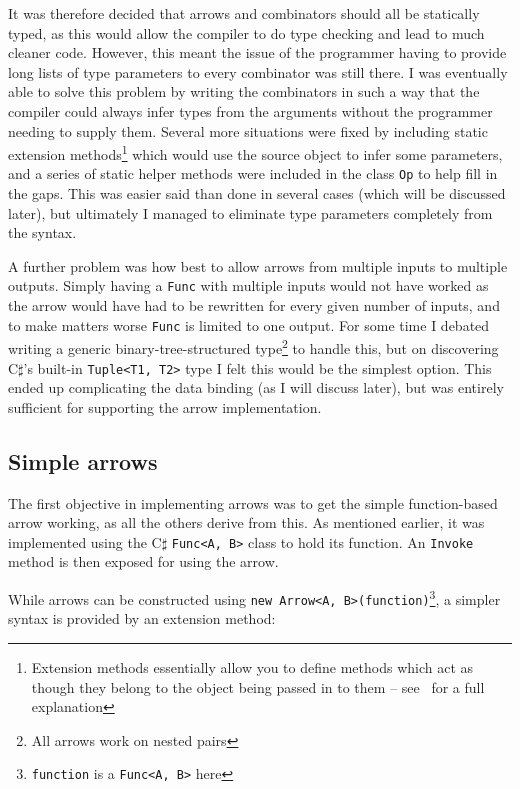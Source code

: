 \documentclass[12pt,twoside,notitlepage]{report}
\begin{document}
It was therefore decided that arrows and combinators should all be statically typed, as this would allow the compiler to do type checking and lead to much cleaner code. However, this meant the issue of the programmer having to provide long lists of type parameters to every combinator was still there. I was eventually able to solve this problem by writing the combinators in such a way that the compiler could always infer types from the arguments without the programmer needing to supply them. Several more situations were fixed by including static extension methods\footnote{Extension methods essentially allow you to define methods which act as though they belong to the object being passed in to them -- see~\cite{extension_methods} for a full explanation} which would use the source object to infer some parameters, and a series of static helper methods were included in the class \texttt{Op} to help fill in the gaps. This was easier said than done in several cases (which will be discussed later), but ultimately I managed to eliminate type parameters completely from the syntax.

A further problem was how best to allow arrows from multiple inputs to multiple outputs. Simply having a \texttt{Func} with multiple inputs would not have worked as the arrow would have had to be rewritten for every given number of inputs, and to make matters worse \texttt{Func} is limited to one output. For some time I debated writing a generic binary-tree-structured type\footnote{All arrows work on nested pairs} to handle this, but on discovering C$\sharp$'s built-in \texttt{Tuple<T1, T2>} type I felt this would be the simplest option. This ended up complicating the data binding (as I will discuss later), but was entirely sufficient for supporting the arrow implementation.


\subsection{Simple arrows} \label{sec:simple_arrow_implementation}

The first objective in implementing arrows was to get the simple function-based arrow working, as all the others derive from this. As mentioned earlier, it was implemented using the C$\sharp$ \texttt{Func<A, B>} class to hold its function. An \texttt{Invoke} method is then exposed for using the arrow.

While arrows can be constructed using \texttt{new Arrow<A, B>(function)}\footnote{\texttt{function} is a \texttt{Func<A, B>} here}, a simpler syntax is provided by an extension method:
\end{document}
